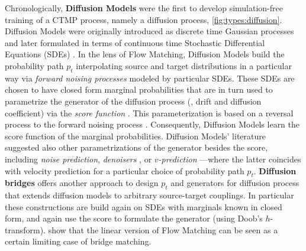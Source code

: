 \documentclass{fairmeta}
\newcommand{\highlight}[1]{{\color{metablue} \textbf{#1}}}
\numberwithin{equation}{section}
\begin{document}
Chronologically, \highlight{Diffusion Models} were the first to develop simulation-free training of a CTMP process, namely a diffusion process, \cref{fig:types:diffusion}. Diffusion Models were originally introduced as discrete time Gaussian processes \citep{sohl2015deep,ho2020denoising} and later formulated in terms of continuous time Stochastic Differential Equations (SDEs) \citep{song2021sde}. In the lens of Flow Matching, Diffusion Models build the probability path $p_t$ interpolating source and target distributions in a particular way via \emph{forward noising processes} modeled by particular SDEs. These SDEs are chosen to have closed form marginal probabilities that are in turn used to parametrize the generator of the diffusion process (\ie, drift and diffusion coefficient) via the \emph{score function} \citep{song2019generative}. This parameterization is based on a reversal process to the forward noising process \citep{anderson1982reverse}. Consequently, Diffusion Models learn the score function of the marginal probabilities. Diffusion Models' literature suggested also other parametrizations of the generator besides the score, including \emph{noise prediction}, \emph{denoisers} \citep{kingma2021variational}, or \emph{$v$-prediction} \citep{salimans2022progressive}---where the latter coincides with velocity prediction for a particular choice of probability path $p_t$. \highlight{Diffusion bridges} \citep{peluchetti2023non} offers another approach to design $p_t$ and generators for diffusion process that extends diffusion models to arbitrary source-target couplings. In particular these constructions are build again on SDEs with marginals known in closed form, and again use the score to formulate the generator (using Doob's $h$-transform). \citet{shi2023diffusion,liu2023i2sb} show that the linear version of Flow Matching can be seen as a certain limiting case of bridge matching.
\end{document}
